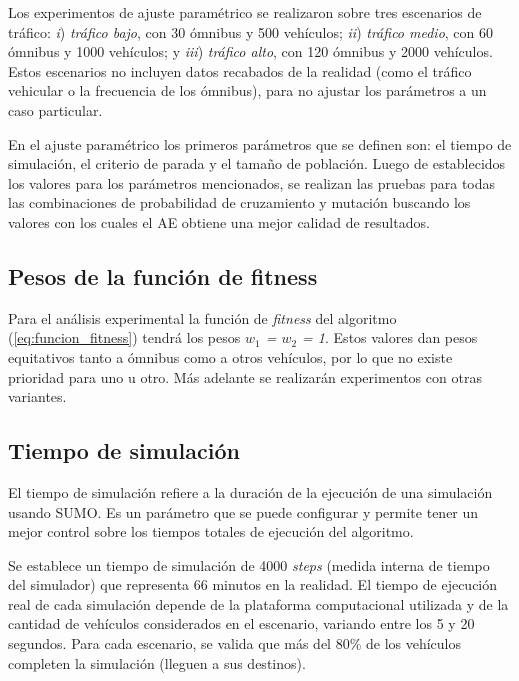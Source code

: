 Los experimentos de ajuste paramétrico se realizaron sobre tres escenarios de tráfico: \emph{i}) \emph{tráfico bajo}, con 30 ómnibus y 500 vehículos; \emph{ii}) \emph{tráfico medio}, con 60 ómnibus y 1000 vehículos; y \emph{iii}) \emph{tráfico alto}, con 120 ómnibus y 2000 vehículos. Estos escenarios no incluyen datos recabados de la realidad (como el tráfico vehicular o la frecuencia de los ómnibus), para no ajustar los parámetros a un caso particular.

En el ajuste paramétrico los primeros parámetros que se definen son: el tiempo de simulación, el criterio de parada y el tamaño de población. Luego de establecidos los valores para los parámetros mencionados, se realizan las pruebas para todas las combinaciones de probabilidad de cruzamiento y mutación buscando los valores con los cuales el AE obtiene una mejor calidad de resultados.


\subsection{Pesos de la función de fitness}

Para el análisis experimental la función de \emph{fitness} del algoritmo (\ref{eq:funcion_fitness}) tendrá los pesos \emph{$w_1$ = $w_2$ = 1}. Estos valores dan pesos equitativos tanto a ómnibus como a otros vehículos, por lo que no existe prioridad para uno u otro. Más adelante se realizarán experimentos con otras variantes.


\subsection{Tiempo de simulación}
El tiempo de simulación refiere a la duración de la ejecución de una simulación usando SUMO. Es un parámetro que se puede configurar y permite tener un mejor control sobre los tiempos totales de ejecución del algoritmo.

Se establece un tiempo de simulación de 4000 \emph{steps} (medida interna de tiempo del simulador) que representa 66 minutos en la realidad. El tiempo de ejecución real de cada simulación depende de la plataforma computacional utilizada y de la cantidad de vehículos considerados en el escenario, variando entre los 5 y 20 segundos. Para cada escenario, se valida que más del 80\% de los vehículos completen la simulación (lleguen a sus destinos). 


